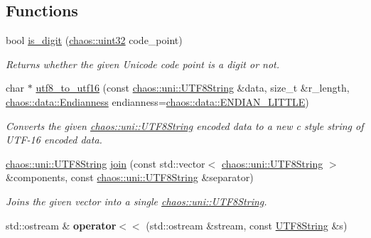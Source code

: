 \subsection*{Functions}
\begin{DoxyCompactItemize}
\item 
bool \hyperlink{namespacechaos_1_1uni_a25a7549a0378aeac227c881220c23640}{is\+\_\+digit} (\hyperlink{namespacechaos_a3b3a47ba1e284655bf1a30c441121c60}{chaos\+::uint32} code\+\_\+point)
\begin{DoxyCompactList}\small\item\em Returns whether the given Unicode code point is a digit or not. \end{DoxyCompactList}\item 
char $\ast$ \hyperlink{namespacechaos_1_1uni_ae9ad4c8b653b2202e908fec0dce094e7}{utf8\+\_\+to\+\_\+utf16} (const \hyperlink{classchaos_1_1uni_1_1_u_t_f8_string}{chaos\+::uni\+::\+U\+T\+F8\+String} \&data, size\+\_\+t \&r\+\_\+length, \hyperlink{namespacechaos_1_1data_adb2657d50c0b84cdc1153001031bbf3f}{chaos\+::data\+::\+Endianness} endianness=\hyperlink{namespacechaos_1_1data_adb2657d50c0b84cdc1153001031bbf3fa7fc5455bb6147c278dfa4a84e255c66d}{chaos\+::data\+::\+E\+N\+D\+I\+A\+N\+\_\+\+L\+I\+T\+T\+L\+E})
\begin{DoxyCompactList}\small\item\em Converts the given \hyperlink{classchaos_1_1uni_1_1_u_t_f8_string}{chaos\+::uni\+::\+U\+T\+F8\+String} encoded data to a new c style string of U\+T\+F-\/16 encoded data. \end{DoxyCompactList}\item 
\hyperlink{classchaos_1_1uni_1_1_u_t_f8_string}{chaos\+::uni\+::\+U\+T\+F8\+String} \hyperlink{namespacechaos_1_1uni_ad2a77983423c8b10e2b18cae6f35d329}{join} (const std\+::vector$<$ \hyperlink{classchaos_1_1uni_1_1_u_t_f8_string}{chaos\+::uni\+::\+U\+T\+F8\+String} $>$ \&components, const \hyperlink{classchaos_1_1uni_1_1_u_t_f8_string}{chaos\+::uni\+::\+U\+T\+F8\+String} \&separator)
\begin{DoxyCompactList}\small\item\em Joins the given vector into a single \hyperlink{classchaos_1_1uni_1_1_u_t_f8_string}{chaos\+::uni\+::\+U\+T\+F8\+String}. \end{DoxyCompactList}\item 
\hypertarget{namespacechaos_1_1uni_ab20a8223562ec1ee8f663bda07c7a3ad}{}std\+::ostream \& {\bfseries operator$<$$<$} (std\+::ostream \&stream, const \hyperlink{classchaos_1_1uni_1_1_u_t_f8_string}{U\+T\+F8\+String} \&s)\label{namespacechaos_1_1uni_ab20a8223562ec1ee8f663bda07c7a3ad}

\end{DoxyCompactItemize}


